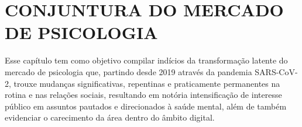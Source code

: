 \chapter{CONJUNTURA DO MERCADO DE PSICOLOGIA}
\label{chap:conjunturaPsicologia}

Esse capítulo tem como objetivo compilar indícios da transformação latente do mercado de psicologia que, partindo desde 2019 através da pandemia SARS-CoV-2, trouxe mudanças significativas, repentinas e praticamente permanentes na rotina e nas relações sociais, resultando em notória intensificação de interesse público em assuntos pautados e direcionados à saúde mental, além de também evidenciar o carecimento da área dentro do âmbito digital.




